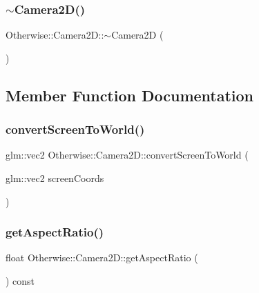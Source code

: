 \subsubsection{\texorpdfstring{$\sim$\+Camera2\+D()}{~Camera2D()}}
{\footnotesize\ttfamily Otherwise\+::\+Camera2\+D\+::$\sim$\+Camera2D (\begin{DoxyParamCaption}{ }\end{DoxyParamCaption})}



\subsection{Member Function Documentation}
\mbox{\label{class_otherwise_1_1_camera2_d_a47d548a2620e1ebaa722d55fc5f05fc9}} 
\subsubsection{\texorpdfstring{convert\+Screen\+To\+World()}{convertScreenToWorld()}}
{\footnotesize\ttfamily glm\+::vec2 Otherwise\+::\+Camera2\+D\+::convert\+Screen\+To\+World (\begin{DoxyParamCaption}\item[{glm\+::vec2}]{screen\+Coords }\end{DoxyParamCaption})}

\mbox{\label{class_otherwise_1_1_camera2_d_a4f25b7bc508530bb2038179eb6ab4a0a}} 
\subsubsection{\texorpdfstring{get\+Aspect\+Ratio()}{getAspectRatio()}}
{\footnotesize\ttfamily float Otherwise\+::\+Camera2\+D\+::get\+Aspect\+Ratio (\begin{DoxyParamCaption}{ }\end{DoxyParamCaption}) const\hspace{0.3cm}{\ttfamily [inline]}}

